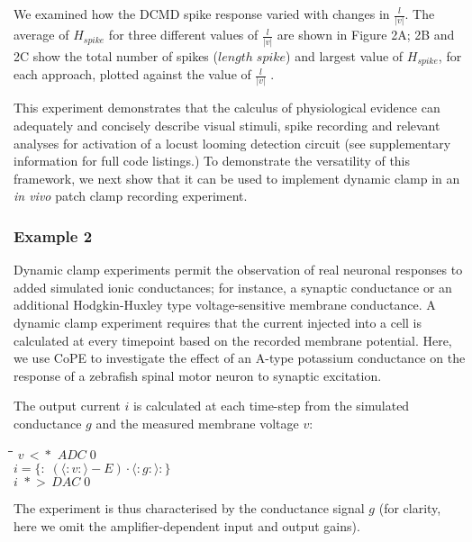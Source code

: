 \documentclass[11pt]{article}
\newlength{\lwidth}\setlength{\lwidth}{4.5cm}
\newlength{\cwidth}\setlength{\cwidth}{8mm} %
\newcommand{\Conid}[1]{\mathit{#1}}
\newcommand{\Varid}[1]{\mathit{#1}}
\begin{document}
We examined how the DCMD spike response varied with changes in
$\frac{l}{|v|}$. The average of \ensuremath{H_{spike}} for three different values
of $\frac{l}{|v|}$ are shown in Figure 2A; 2B and 2C show the total
number of spikes (\ensuremath{\Varid{length}\;\Varid{spike}}) and largest value of \ensuremath{H_{spike}}, for
each approach, plotted against the value of $\frac{l}{|v|}$
\citep{Hatsopoulos1995}.

This experiment demonstrates that the calculus of physiological
evidence can adequately and concisely describe visual stimuli, spike
recording and relevant analyses for activation of a locust looming
detection circuit (see supplementary information for full code
listings.) To demonstrate the versatility of this framework, we next
show that it can be used to implement dynamic clamp in an \emph{in
  vivo} patch clamp recording experiment.

\subsubsection*{Example 2}

Dynamic clamp experiments \citep{Robinson1993, Sharp1993} permit the
observation of real neuronal responses to added simulated ionic
conductances; for instance, a synaptic conductance or an additional
Hodgkin-Huxley type voltage-sensitive membrane conductance. A dynamic
clamp experiment requires that the current injected into a cell is
calculated at every timepoint based on the recorded membrane
potential. Here, we use CoPE to investigate the effect of an A-type
potassium conductance \citep{Connor1971} on the response of a zebrafish
spinal motor neuron to synaptic excitation.

The output current
%
%
\ensuremath{\Varid{i}} is calculated at each time-step from the simulated conductance \ensuremath{\Varid{g}}
and the measured membrane voltage \ensuremath{\Varid{v}}:
\begin{tabbing}
\qquad\=\hspace{\lwidth}\=\hspace{\cwidth}\=\+\kill
${\Varid{v}\,<\!\!\!*\,\,\Conid{ADC}\;\mathrm{0}}$\\
${\Varid{i}\mathrel{=}\{\!:\!\;(\langle:\Varid{v}:\rangle\mathbin{-}\Conid{E})\!\cdot\!\langle:\Varid{g}:\rangle\!:\!\}}$\\
${\Varid{i}\,\,*\!\!\!>\,\Conid{DAC}\;\mathrm{0}}$
\end{tabbing}The experiment is thus characterised by the conductance signal $g$
(for clarity, here we omit the amplifier-dependent input and output
gains).
\end{document}

